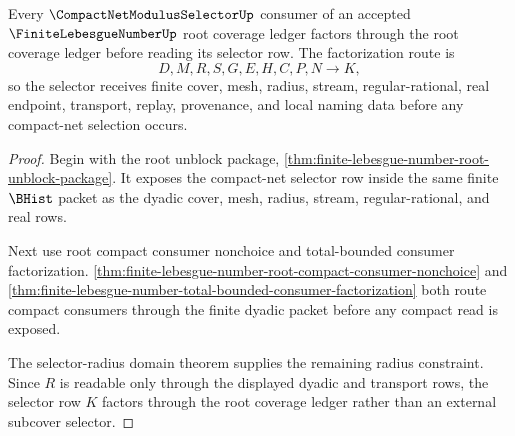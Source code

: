 \begin{theorem}
\label{thm:finite-lebesgue-number-compactnet-selector-factorization}
Every $\CompactNetModulusSelectorUp$ consumer of an accepted $\FiniteLebesgueNumberUp$ root coverage ledger factors through the root coverage ledger before reading its selector row. The factorization route is
$$
D,M,R,S,G,E,H,C,P,N \to K,
$$
so the selector receives finite cover, mesh, radius, stream, regular-rational, real endpoint, transport, replay, provenance, and local naming data before any compact-net selection occurs.
\end{theorem}
\begin{proof}
Begin with the root unblock package, \autoref{thm:finite-lebesgue-number-root-unblock-package}. It exposes the compact-net selector row inside the same finite $\BHist$ packet as the dyadic cover, mesh, radius, stream, regular-rational, and real rows.

Next use root compact consumer nonchoice and total-bounded consumer factorization. \autoref{thm:finite-lebesgue-number-root-compact-consumer-nonchoice} and \autoref{thm:finite-lebesgue-number-total-bounded-consumer-factorization} both route compact consumers through the finite dyadic packet before any compact read is exposed.

The selector-radius domain theorem supplies the remaining radius constraint. Since $R$ is readable only through the displayed dyadic and transport rows, the selector row $K$ factors through the root coverage ledger rather than an external subcover selector.
\end{proof}


